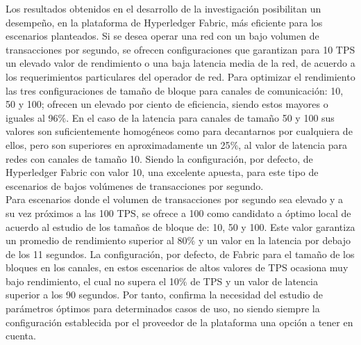 \begin{conclusions}
Los resultados obtenidos en el desarrollo de la investigaci\'on posibilitan un desempe\~no, en la plataforma de Hyperledger Fabric, m\'as eficiente para los escenarios planteados. Si se desea operar una red con un bajo volumen de transacciones por segundo, se ofrecen configuraciones que garantizan para 10 TPS un elevado valor de rendimiento o una baja latencia media de la red, de acuerdo a los requerimientos particulares del operador de red. Para optimizar el rendimiento las tres configuraciones de tama\~no de bloque para canales de comunicaci\'on: 10, 50 y 100; ofrecen un elevado por ciento de eficiencia, siendo estos mayores o iguales al 96$\%$. En el caso de la latencia para canales de tama\~no 50 y 100 sus valores son suficientemente homog\'eneos como para decantarnos por cualquiera de ellos, pero son superiores en aproximadamente un 25$\%$, al valor de latencia para redes con canales de tama\~no 10. Siendo la configuraci\'on, por defecto, de Hyperledger Fabric con valor 10, una excelente apuesta, para este tipo de escenarios de bajos vol\'umenes de transacciones por segundo.\\

Para escenarios donde el volumen de transacciones por segundo sea elevado y a su vez pr\'oximos a las 100 TPS, se ofrece a 100 como candidato a \'optimo local de acuerdo al estudio de los tama\~nos de bloque de: 10, 50 y 100. Este valor garantiza un promedio de rendimiento superior al 80$\%$ y un valor en la latencia por debajo de los 11 segundos. La configuraci\'on, por defecto, de Fabric para el tama\~no de los bloques en los canales, en estos escenarios de altos valores de TPS ocasiona muy bajo rendimiento, el cual no supera el 10$\%$ de TPS y un valor de latencia superior a los 90 segundos. Por tanto, confirma la necesidad del estudio de par\'ametros \'optimos para determinados casos de uso, no siendo siempre la configuraci\'on establecida por el proveedor de la plataforma una opci\'on a tener en cuenta.  
\end{conclusions}
